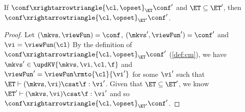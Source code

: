 \begin{lemma}
\label{lem:mono-et}
If $\conf \xrightarrowtriangle{\cl, \opset}_{\ET} \conf'$ and $\ET \subseteq \ET'$, 
then $\conf \xrightarrowtriangle{\cl, \opset}_{\ET'} \conf'$.
\end{lemma}
\begin{proof}
    Let \((\mkvs, \viewFun)  = \conf \), \( (\mkvs', \viewFun') = \conf' \) and \( \vi  =\viewFun(\cl) \)
    By the definition of  $\conf \xrightarrowtriangle{\cl, \opset}_{\ET} \conf'$ (\cref{def:cm}), we have \(\mkvs' \in \updKV{\mkvs, \vi, \cl, \f}\) and  \( \viewFun' = \viewFun\rmto{\cl}{\vi'} \) for some \( \vi' \) such that \( \ET \vdash (\mkvs, \vi) \csat \f : \vi' \).
    Given that \( \ET \subseteq \ET'\), we know \( \ET' \vdash (\mkvs, \vi) \csat \f : \vi' \) and so $\conf \xrightarrowtriangle{\cl, \opset}_{\ET'} \conf'$.
\end{proof}


